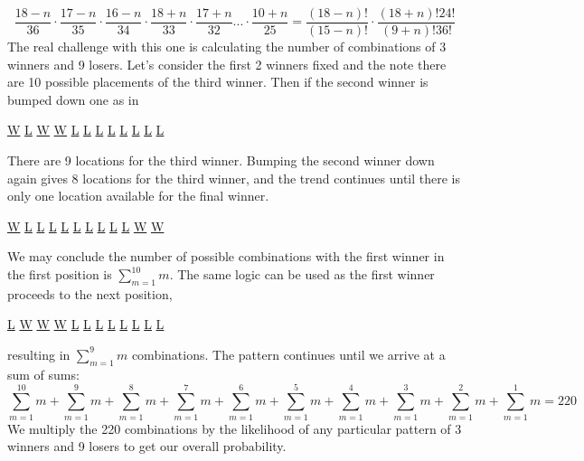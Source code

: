 \documentclass[11pt]{article}
\begin{document}
\begin {equation} 
\frac{18-n}{36}\cdot \frac{17-n}{35}\cdot \frac{16-n}{34} \cdot \frac{18+n}{33}\cdot \frac{17+n}{32}...\cdot \frac {10+n}{25}=\frac{(18-n)!}{(15-n)!}\cdot \frac{(18+n)!24!}{(9+n)!36!}
\end{equation}
The real challenge with this one is calculating the number of combinations of 3 winners and 9 losers. Let's consider the first 2 winners fixed and the note there are 10 possible placements of the third winner. Then if the second winner is bumped down one as in
\begin {center}
  \underline{W} \underline{L} \underline{W} \underline{W} \underline{L} \underline{L} \underline{L} \underline{L} \underline{L} \underline{L} \underline{L} \underline{L}\\
  \end{center}
There are 9 locations for the third winner. Bumping the second winner down again gives 8 locations for the third winner, and the trend continues until there is only one location available for the final winner. 
\begin {center}
  \underline{W} \underline{L} \underline{L} \underline{L} \underline{L} \underline{L} \underline{L} \underline{L} \underline{L} \underline{L} \underline{W} \underline{W}\\
  \end{center}
We may conclude the number of possible combinations with the first winner in the first position is $ \displaystyle\sum_{m=1}^{10} m $. The same logic can be used as the first winner proceeds to the next position,
\begin {center}
  \underline{L} \underline{W} \underline{W} \underline{W} \underline{L} \underline{L} \underline{L} \underline{L} \underline{L} \underline{L} \underline{L} \underline{L}\\
  \end{center}
resulting in $ \displaystyle\sum_{m=1}^{9} m $ combinations. The pattern continues until we arrive at a sum of sums:
\begin{equation}
  \displaystyle\sum_{m=1}^{10} m +\displaystyle\sum_{m=1}^{9} m +\displaystyle\sum_{m=1}^{8} m +\displaystyle\sum_{m=1}^{7} m +\displaystyle\sum_{m=1}^{6} m +\displaystyle\sum_{m=1}^{5} m +\displaystyle\sum_{m=1}^{4} m +\displaystyle\sum_{m=1}^{3} m +\displaystyle\sum_{m=1}^{2} m +\displaystyle\sum_{m=1}^{1} m= 220
\end{equation}
We multiply the 220 combinations by the likelihood of any particular pattern of 3 winners and 9 losers to get our overall probability.
\end{document}

